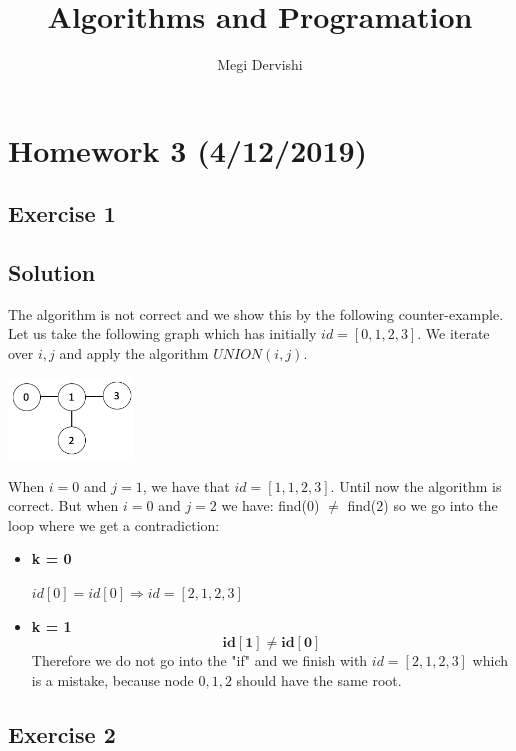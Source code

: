 \documentclass[10pt,a4paper]{article}
\author{Megi Dervishi}
\title{Algorithms and Programation}
\begin{document}
\maketitle
\section*{Homework 3 (4/12/2019)}
\subsection*{Exercise 1}
\subsection*{Solution}
The algorithm is not correct and we show this by the following counter-example.
Let us take the following graph which has initially $id = [0,1,2,3]$. We iterate over $i,j$ and apply the algorithm $UNION(i,j)$.
\begin{center}
\includegraphics[width=0.25\textwidth]{graph.png}
\end{center}
When $i = 0$ and $j = 1$, we have that $id = [1,1,2,3]$. Until now the algorithm is correct. But when $i = 0$ and $ j = 2 $ we have: find($0$) $\neq$ find($2$)  so we go into the loop where we get a contradiction:
\begin{itemize}
\item \textbf{k = 0}
\begin{center}
  $ id[0] = id[0] \Rightarrow id = [2,1,2,3]$
\end{center}
\item \textbf{k = 1}
$$ \mathbf{id[1] \neq id[0]}$$ Therefore we do not go into the "if" and we finish with $id = [2,1,2,3]$ which is a mistake, because node $0,1,2$ should have the same root.

\end{itemize}
\subsection*{Exercise 2}
\end{document}
